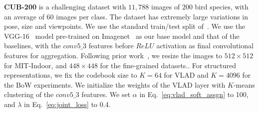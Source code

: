 \documentclass{bmvc2k}
\newcommand{\comment}[1]{}
\newcommand{\ms}[1]{{\color{blue}{#1}}}
\newcommand{\comment}[1]{}
\newcommand{\ms}[1]{ #1 }
\newcommand{\bs}{\mathbf{s}}
\begin{document}
\textbf{CUB-200}  is a challenging dataset with $11,788$ images of $200$ bird species, with an average of $60$ images per class. The dataset has extremely large variations in pose, size and viewpoints. We use the standard train/test split of~\cite{ucsdbirds}. 
We use the VGG-16~\cite{vgg16} model pre-trained on Imagenet~\cite{Alexnet} as our base model and that of the baselines, with the $conv5\_3$ features before $ReLU$ activation as final convolutional features for aggregation. 
Following prior work~\cite{mfafvnet,bcnn}, we resize the images to $512 \times 512$ for MIT-Indoor,  and $448 \times 448$ for the fine-grained datasets.\comment{Data augmentation is carried out on all datasets by performing random cropping and horizontal flipping.}\ms{At test time, we flip the image and average the predictions for the original and flipped image}. For structured representations, we fix the codebook size to $K=64$ for VLAD and $K=4096$ for the BoW experiments. We initialize the weights  %
of the VLAD layer with $K$-means clustering of the $conv5\_3$ features.
We set $\alpha$ in Eq.~\ref{eq:vlad_soft_assgn} to 100, and $\lambda$ in Eq.~\ref{eq:joint_loss} to 0.4. 
\end{document}
